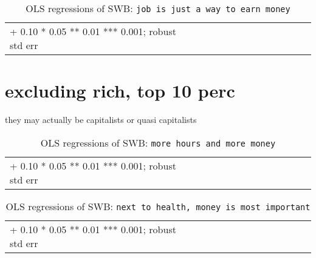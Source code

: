 \documentclass[10pt, letterpaper]{article}
\begin{document}
\begin{spacing}{1.8}
\begin{spacing}{.9} \begin{table}[H]\centering  \label{d} \begin{scriptsize} \begin{tabular}{p{1.8in}p{.5in}p{.5in}p{.5in}p{.5in}p{.5in}p{.5in}p{.5in}p{.5in}p{.5in}p{.5 in}p{.5in}p{.5 in}}\hline  \hline + 0.10 * 0.05 ** 0.01 *** 0.001; robust std err \end{tabular}\end{scriptsize}\caption{OLS regressions of SWB:  \texttt{job is just a way to earn money}}\end{table} \end{spacing}


\section{excluding rich, top 10 perc}
they may actually be capitalists or quasi capitalists

\begin{spacing}{.9} \begin{table}[H]\centering  \label{a} \begin{scriptsize} \begin{tabular}{p{1.8in}p{.5in}p{.5in}p{.5in}p{.5in}p{.5in}p{.5in}p{.5in}p{.5in}p{.5in}p{.5 in}p{.5in}p{.5 in}}\hline  \hline + 0.10 * 0.05 ** 0.01 *** 0.001; robust std err \end{tabular}\end{scriptsize}\caption{OLS regressions of SWB: \texttt{more hours and more money}}\end{table} \end{spacing}

\begin{spacing}{.9} \begin{table}[H]\centering  \label{b} \begin{scriptsize} \begin{tabular}{p{1.8in}p{.5in}p{.5in}p{.5in}p{.5in}p{.5in}p{.5in}p{.5in}p{.5in}p{.5in}p{.5 in}p{.5in}p{.5 in}}\hline  \hline + 0.10 * 0.05 ** 0.01 *** 0.001; robust std err \end{tabular}\end{scriptsize}\caption{OLS regressions of SWB:  \texttt{next to  health, money is most  important}}\end{table} \end{spacing}


\end{spacing}
\end{document}
